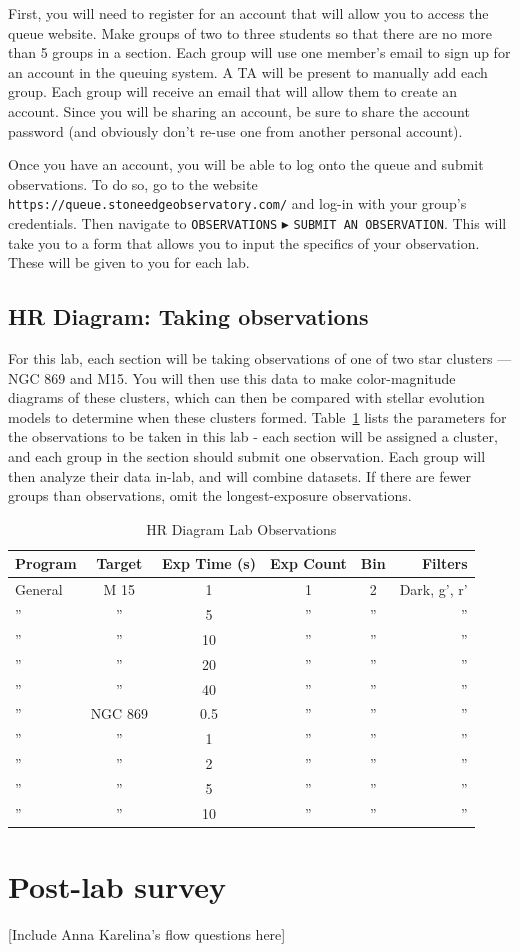 First, you will need to register for an account that will allow you to access the queue website. Make groups of two to three students so that there are no more than 5 groups in a section. Each group will use one member’s email to sign up for an account in the queuing system. A TA will be present to manually add each group. Each group will receive an email that will allow them to create an account. Since you will be sharing an account, be sure to share the account password (and obviously don't re-use one from another personal account).

Once you have an account, you will be able to log onto the queue and submit observations. To do so, go to the website \texttt{https://queue.stoneedgeobservatory.com/} and log-in with your group's credentials. Then navigate to \texttt{OBSERVATIONS} $\blacktriangleright$ \texttt{SUBMIT AN OBSERVATION}. This will take you to a form that allows you to input the specifics of your observation. These will be given to you for each lab.

\subsection{HR Diagram: Taking observations}
For this lab, each section will be taking observations of one of two star clusters --- NGC 869 and M15. You will then use this data to make color-magnitude diagrams of these clusters, which can then be compared with stellar evolution models to determine when these clusters formed. Table~\ref{hr_diagram_obs} lists the parameters for the observations to be taken in this lab - each section will be assigned a cluster, and each group in the section should submit one observation. Each group will then analyze their data in-lab, and will combine datasets. If there are fewer groups than observations, omit the longest-exposure observations.

\begin{table}
    \centering
    \caption{HR Diagram Lab Observations}
    \label{hr_diagram_obs}
    \begin{tabular}{|l|c|c|c|c|r|}
    \hline
    \textbf{Program} & \textbf{Target} & \textbf{Exp Time (s)} & \textbf{Exp Count} & \textbf{Bin}
         & \textbf{Filters} \\
    \hline
    General & M 15 & 1 & 1 & 2 & Dark, g', r'\\
    \hline
    '' & '' & 5 & '' & '' & '' \\
    \hline
    '' & '' & 10 & '' & '' & '' \\
    \hline
    '' & '' & 20 & '' & '' & '' \\
    \hline
    '' & '' & 40 & '' & '' & '' \\
    \hline
    '' & NGC 869 & 0.5 & '' & '' & ''\\
    \hline
    '' & '' & 1 & '' & '' & '' \\
    \hline
    '' & '' & 2 & '' & '' & '' \\
    \hline
    '' & '' & 5 & '' & '' & '' \\
    \hline
    '' & '' & 10 & '' & '' & '' \\
    \hline
    \end{tabular}
\end{table}

\section{Post-lab survey}

[Include Anna Karelina's flow questions here]

